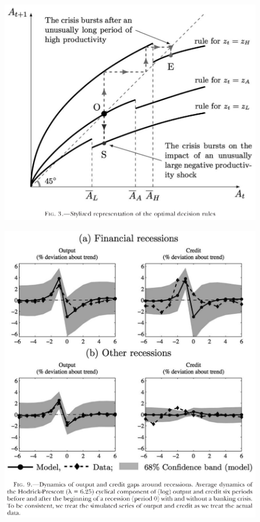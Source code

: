 \documentclass{beamer}
\begin{document}
\begin{frame}
  \begin{figure}
    \includegraphics[scale=.7]{boissay2.eps}
  \end{figure}
\end{frame}

\begin{frame}
  \begin{figure}
    \includegraphics[scale=.7]{boissay3.eps}
  \end{figure}
\end{frame}

\end{document}
